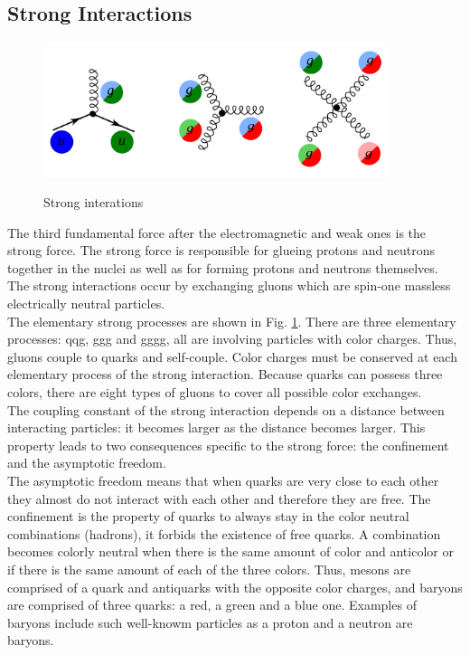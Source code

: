 \subsection{Strong Interactions}
\label{sec:Intro_QCD}

\begin{figure}[htb]
  \begin{center}
    {\includegraphics[width=0.90\textwidth]{../figs/Intro/feynmStrong.png}}
    \caption{Strong interations}
    \label{fig:feynmStrong}
  \end{center}
\end{figure}


The third fundamental force after the electromagnetic and weak ones is the strong force. The strong force is responsible for glueing protons and neutrons together in the nuclei as well as for forming protons and neutrons themselves. The strong interactions occur by exchanging gluons which are spin-one massless electrically neutral particles.  \\

The elementary strong processes are shown in Fig. \ref{fig:feynmStrong}. There are three elementary processes: qqg, ggg and gggg, all are involving particles with color charges. Thus, gluons couple to quarks and self-couple. Color charges must be conserved at each elementary process of the strong interaction. Because quarks can possess three colors, there are eight types of gluons to cover all possible color exchanges. \\

The coupling constant of the strong interaction depends on a distance between interacting particles: it becomes larger as the distance becomes larger. This property leads to two consequences specific to the strong force: the confinement and the asymptotic freedom.\\

The asymptotic freedom means that when quarks are very close to each other they almost do not interact with each other and therefore they are free. The confinement is the property of quarks to always stay in the color neutral combinations (hadrons), it forbids the existence of free quarks. A combination becomes colorly neutral when there is the same amount of color and anticolor or if there is the same amount of each of the three colors.  Thus, mesons are comprised of a quark and antiquarks with the opposite color charges, and baryons are comprised of three quarks: a red, a green and a blue one. Examples of baryons include such well-knowm particles as a proton and a neutron are baryons.\\

